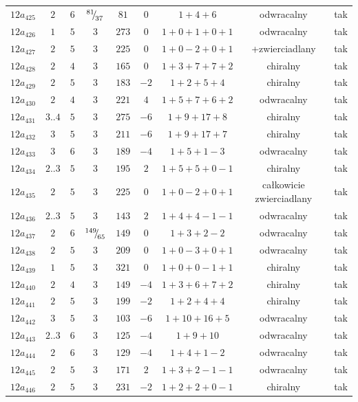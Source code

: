 \begin{longtable}{ccccccccc}
$12a_{425}$ & $2$ & $6$ & ${}^{81}{\mskip -5mu/\mskip -3mu}_{37}$ & $81$ & $0$ & $1+4+6$ & odwracalny & tak \\
$12a_{426}$ & $1$ & $5$ & $3$ & $273$ & $0$ & $1+0+1+0+1$ & odwracalny & tak \\
$12a_{427}$ & $2$ & $5$ & $3$ & $225$ & $0$ & $1+0-2+0+1$ & +zwierciadlany & tak \\
$12a_{428}$ & $2$ & $4$ & $3$ & $165$ & $0$ & $1+3+7+7+2$ & chiralny & tak \\
$12a_{429}$ & $2$ & $5$ & $3$ & $183$ & $-2$ & $1+2+5+4$ & chiralny & tak \\
$12a_{430}$ & $2$ & $4$ & $3$ & $221$ & $4$ & $1+5+7+6+2$ & odwracalny & tak \\
$12a_{431}$ & $3..4$ & $5$ & $3$ & $275$ & $-6$ & $1+9+17+8$ & chiralny & tak \\
$12a_{432}$ & $3$ & $5$ & $3$ & $211$ & $-6$ & $1+9+17+7$ & chiralny & tak \\
$12a_{433}$ & $3$ & $6$ & $3$ & $189$ & $-4$ & $1+5+1-3$ & odwracalny & tak \\
$12a_{434}$ & $2..3$ & $5$ & $3$ & $195$ & $2$ & $1+5+5+0-1$ & chiralny & tak \\
$12a_{435}$ & $2$ & $5$ & $3$ & $225$ & $0$ & $1+0-2+0+1$ & całkowicie zwierciadlany & tak \\
$12a_{436}$ & $2..3$ & $5$ & $3$ & $143$ & $2$ & $1+4+4-1-1$ & odwracalny & tak \\
$12a_{437}$ & $2$ & $6$ & ${}^{149}{\mskip -5mu/\mskip -3mu}_{65}$ & $149$ & $0$ & $1+3+2-2$ & odwracalny & tak \\
$12a_{438}$ & $2$ & $5$ & $3$ & $209$ & $0$ & $1+0-3+0+1$ & odwracalny & tak \\
$12a_{439}$ & $1$ & $5$ & $3$ & $321$ & $0$ & $1+0+0-1+1$ & chiralny & tak \\
$12a_{440}$ & $2$ & $4$ & $3$ & $149$ & $-4$ & $1+3+6+7+2$ & chiralny & tak \\
$12a_{441}$ & $2$ & $5$ & $3$ & $199$ & $-2$ & $1+2+4+4$ & chiralny & tak \\
$12a_{442}$ & $3$ & $5$ & $3$ & $103$ & $-6$ & $1+10+16+5$ & odwracalny & tak \\
$12a_{443}$ & $2..3$ & $6$ & $3$ & $125$ & $-4$ & $1+9+10$ & odwracalny & tak \\
$12a_{444}$ & $2$ & $6$ & $3$ & $129$ & $-4$ & $1+4+1-2$ & odwracalny & tak \\
$12a_{445}$ & $2$ & $5$ & $3$ & $171$ & $2$ & $1+3+2-1-1$ & odwracalny & tak \\
$12a_{446}$ & $2$ & $5$ & $3$ & $231$ & $-2$ & $1+2+2+0-1$ & chiralny & tak \\

\end{longtable}

